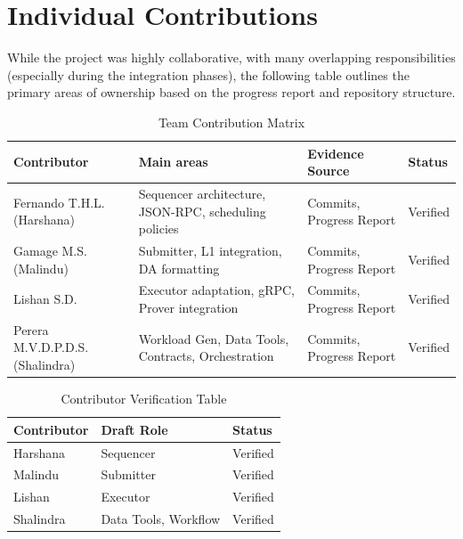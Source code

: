 \section{Individual Contributions}
\label{sec:individual_contributions}
While the project was highly collaborative, with many overlapping responsibilities (especially during the integration phases), the following table outlines the primary areas of ownership based on the progress report and repository structure.

\begin{table}[H]
\centering
\caption{Team Contribution Matrix}
\label{tab:contributions}
\small
\begin{tabularx}{\textwidth}{l X X l}
\toprule
\textbf{Contributor} & \textbf{Main areas} & \textbf{Evidence Source} & \textbf{Status} \\
\midrule
Fernando T.H.L. (Harshana) & Sequencer architecture, JSON-RPC, scheduling policies & Commits, Progress Report & Verified \\
\addlinespace
Gamage M.S. (Malindu) & Submitter, L1 integration, DA formatting & Commits, Progress Report & Verified \\
\addlinespace
Lishan S.D. & Executor adaptation, gRPC, Prover integration & Commits, Progress Report & Verified \\
\addlinespace
Perera M.V.D.P.D.S. (Shalindra) & Workload Gen, Data Tools, Contracts, Orchestration & Commits, Progress Report & Verified \\
\bottomrule
\end{tabularx}
\end{table}

\begin{table}[H]
\centering
\caption{Contributor Verification Table}
\begin{tabular}{|l|l|l|}
\hline
\textbf{Contributor} & \textbf{Draft Role} & \textbf{Status} \\ \hline
Harshana & Sequencer & Verified \\ \hline
Malindu & Submitter & Verified \\ \hline
Lishan & Executor & Verified \\ \hline
Shalindra & Data Tools, Workflow & Verified \\ \hline
\end{tabular}
\end{table}
